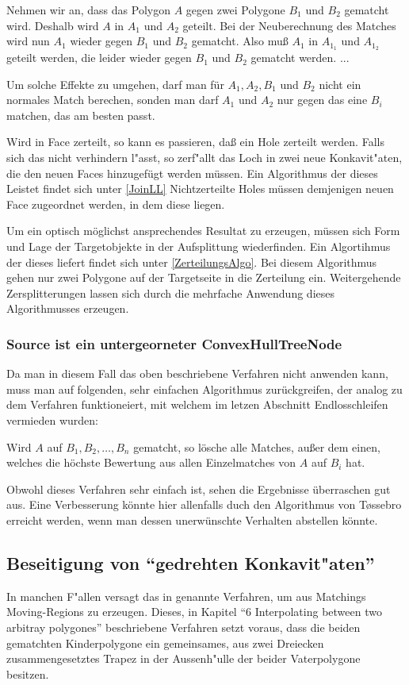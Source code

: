 Nehmen wir an, dass das Polygon $A$ gegen zwei Polygone $B_1$ und $B_2$ gematcht wird. Deshalb wird $A$ in $A_1$ und $A_2$ geteilt. Bei der Neuberechnung des Matches wird nun $A_1$ wieder gegen $B_1$  und $B_2$ gematcht. Also muß $A_1$ in $A_{1_1}$ und $A_{1_2}$ geteilt werden, die leider wieder gegen $B_1$ und $B_2$ gematcht werden. ...

Um solche Effekte zu umgehen, darf man für $A_1, A_2,B_1$ und $B_2$ nicht ein normales Match berechen, sonden man darf $A_1$ und $A_2$ nur gegen das eine $B_i$ matchen, das am besten passt. 

Wird in Face zerteilt, so kann es passieren, daß ein Hole zerteilt werden. Falls sich das nicht verhindern l"asst, so zerf"allt das Loch in zwei neue Konkavit"aten, die den neuen Faces hinzugefügt werden müssen. Ein Algorithmus der dieses Leistet findet sich unter \ref{JoinLL} Nichtzerteilte Holes müssen demjenigen neuen Face zugeordnet werden, in dem diese liegen.

Um ein optisch möglichst ansprechendes Resultat zu erzeugen, müssen sich Form und Lage der Targetobjekte in der Aufsplittung wiederfinden. Ein Algortihmus der dieses liefert findet sich unter \ref{ZerteilungsAlgo}. Bei diesem Algorithmus gehen nur zwei Polygone auf der Targetseite in die Zerteilung ein. Weitergehende Zersplitterungen lassen sich durch die mehrfache Anwendung dieses Algorithmusses erzeugen.

\subsubsection*{Source ist ein untergeorneter ConvexHullTreeNode}

Da man in diesem Fall das oben beschriebene Verfahren nicht anwenden kann, muss man auf folgenden, sehr einfachen Algorithmus zurückgreifen, der analog zu dem Verfahren funktioneiert, mit welchem im letzen Abschnitt Endlosschleifen vermieden wurden:

Wird $A$ auf  $B_1,B_2, \hdots ,B_n$ gematcht, so lösche alle Matches, außer dem einen, welches die höchste Bewertung aus allen Einzelmatches von $A$ auf $B_i$ hat.

Obwohl dieses Verfahren sehr einfach ist, sehen die Ergebnisse überraschen gut aus. Eine Verbesserung könnte hier allenfalls duch den Algorithmus von T\o{}ssebro erreicht werden, wenn man dessen unerwünschte Verhalten abstellen könnte.

\subsection{Beseitigung von "`gedrehten Konkavit"aten"'}\label{gedrehtKon}
In manchen F"allen versagt das in \cite{TG} genannte Verfahren, um aus Matchings Moving-Regions zu erzeugen. Dieses, in Kapitel "`6 Interpolating between two arbitray polygones"' beschriebene Verfahren setzt voraus, dass die beiden gematchten Kinderpolygone ein gemeinsames, aus zwei Dreiecken zusammengesetztes Trapez in der Aussenh"ulle der beider Vaterpolygone besitzen. 

